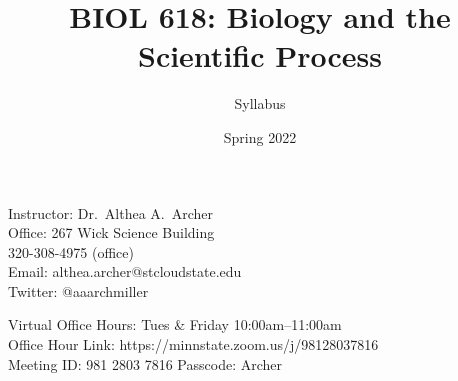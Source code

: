 \documentclass{tufte-handout}
\title{BIOL 618: Biology and the Scientific Process}										%
\author{Syllabus}								%
\date{Spring 2022}
\begin{document}
\maketitle

Instructor: Dr.~Althea A.~Archer\\
Office: 267 Wick Science Building\\
320-308-4975 (office) \\
Email: althea.archer@stcloudstate.edu\\
Twitter: @aaarchmiller

\color{gray} Virtual Office Hours: Tues \& Friday 10:00am--11:00am \\
Office Hour Link: https://minnstate.zoom.us/j/98128037816\\
Meeting ID: 981 2803 7816 Passcode: Archer \color{black}
\end{document}
